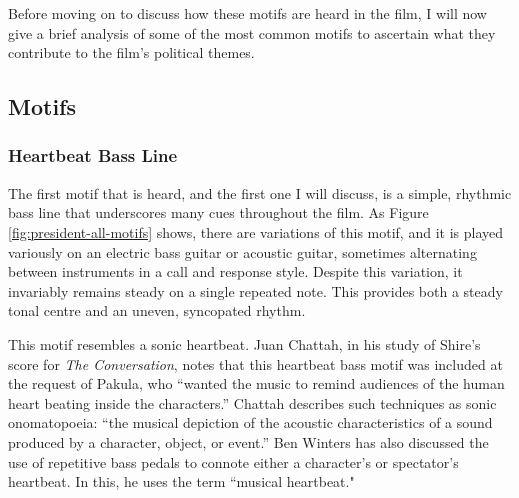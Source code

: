 Before moving on to discuss how these motifs are heard in the film, I will now give a brief analysis of some of the most common motifs to ascertain what they contribute to the film’s political themes.



\subsection{Motifs
}
\subsubsection{Heartbeat Bass Line}

The first motif that is heard, and the first one I will discuss, is a simple, rhythmic bass line that underscores many cues throughout the film.
As Figure \ref{fig:president-all-motifs} shows, there are variations of this motif, and it is played variously on an electric bass guitar or acoustic guitar, sometimes alternating between instruments in a call and response style.
Despite this variation, it invariably remains steady on a single repeated note.
This provides both a steady tonal centre and an uneven, syncopated rhythm.

This motif resembles a sonic heartbeat.
Juan Chattah, in his study of Shire's score for \textit{The Conversation}, notes that this heartbeat bass motif was included at the request of Pakula, who ``wanted the music to remind audiences of the human heart beating inside the characters.”\autocites[][91]{chattah_david_2015}
Chattah describes such techniques as sonic onomatopoeia: ``the musical depiction of the acoustic characteristics of a sound produced by a character, object, or event.”\autocites[][88]{chattah_david_2015}
Ben Winters has also discussed the use of repetitive bass pedals to connote either a character's or spectator's heartbeat.
In this, he uses the term ``musical heartbeat."\autocites[][]{winters_corporeality_2008}

